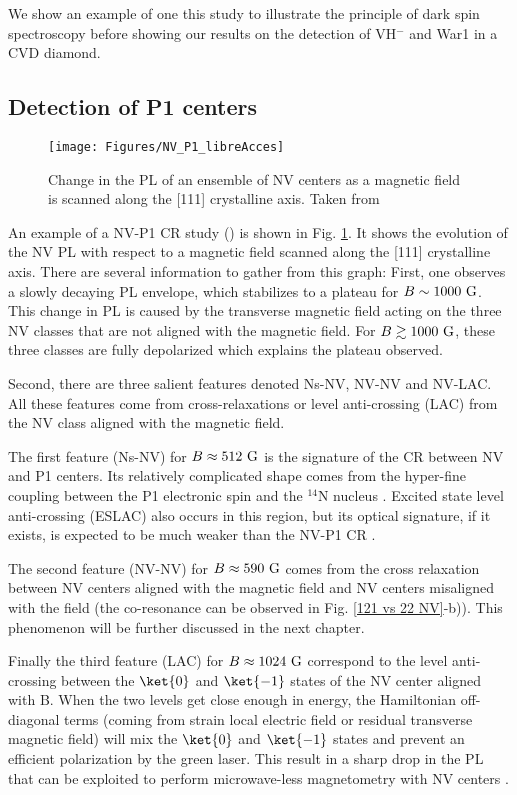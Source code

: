 \documentclass[a4paper,11pt]{report}
\begin{document}
We show an example of one this study to illustrate the principle of dark spin spectroscopy before showing our results on the detection of VH$^-$ and War1 in a CVD diamond.

\subsection{Detection of P1 centers}

\begin{figure}[h]
\centering
\texttt{[image: Figures/NV\_P1\_libreAcces]}
\caption{Change in the PL of an ensemble of NV centers as a magnetic field is scanned along the [111] crystalline axis. Taken from \citep{armstrong2010nv}}
\label{CR P1 exp}
\end{figure}

An example of a NV-P1 CR study (\citep{armstrong2010nv}) is shown in Fig. \ref{CR P1 exp}. It shows the evolution of the NV PL with respect to a magnetic field scanned along the [111] crystalline axis. There are several information to gather from this graph: First, one observes a slowly decaying PL envelope, which stabilizes to a plateau for $B\sim 1000\ \rm G$. This change in PL is caused by the transverse magnetic field acting on the three NV classes that are not aligned with the magnetic field. For $B \gtrsim 1000\ \rm G$, these three classes are fully depolarized which explains the plateau observed.

Second, there are three salient features denoted Ns-NV, NV-NV and NV-LAC. All these features come from cross-relaxations or level anti-crossing (LAC) from the NV class aligned with the magnetic field.

The first feature (Ns-NV) for $B\approx 512 \ \rm G$ is the signature of the CR between NV and P1 centers. Its relatively complicated shape comes from the hyper-fine coupling between the P1 electronic spin and the $^{14}$N nucleus \citep{lazda2021cross}. Excited state level anti-crossing (ESLAC) also occurs in this region, but its optical signature, if it exists, is expected to be much weaker than the NV-P1 CR \citep{zheng2017level}.

The second feature (NV-NV) for $B\approx 590 \ \rm G$ comes from the cross relaxation between NV centers aligned with the magnetic field and NV centers misaligned with the field (the co-resonance can be observed in Fig. \ref{121 vs 22 NV}-b)). This phenomenon will be further discussed in the next chapter.

Finally the third feature (LAC) for $B\approx 1024 \ \rm G$ correspond to the level anti-crossing between the $\ket{0}$ and $\ket{-1}$ states of the NV center aligned with B. When the two levels get close enough in energy, the Hamiltonian off-diagonal terms (coming from strain local electric field or residual transverse magnetic field) will mix the $\ket{0}$ and $\ket{-1}$ states and prevent an efficient polarization by the green laser. This result in a sharp drop in the PL that can be exploited to perform microwave-less magnetometry with NV centers \citep{wickenbrock2016microwave, zheng2017level, zheng2020microwave}.
\end{document}
